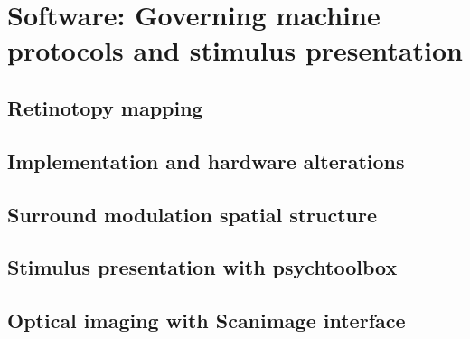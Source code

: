 \section{Software: Governing machine protocols and stimulus presentation}
\label{sec:sectionc}

\subsection{Retinotopy mapping}
\label{subsec:subasectionC}

\subsection{Implementation and hardware alterations}
\label{subsec:subbsectionC}

\subsection{Surround modulation spatial structure}
\label{subsec:subcsectionC}

\subsection{Stimulus presentation with psychtoolbox}
\label{subsec:subdsectionC}

\subsection{Optical imaging with Scanimage interface}
\label{subsec:subesectionC}